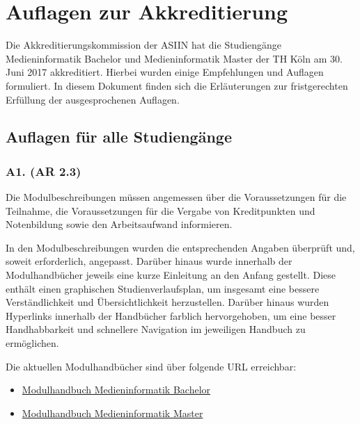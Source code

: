 \chapter{Auflagen zur
Akkreditierung\label{/mi-2017/selbstbericht/auflagen/0000-auflagen}}\label{auflagen-zur-akkreditierungpathlabelmi-2017selbstberichtauflagen0000-auflagen}

Die Akkreditierungskommission der ASIIN hat die Studiengänge
Medieninformatik Bachelor und Medieninformatik Master der TH Köln am 30.
Juni 2017 akkreditiert. Hierbei wurden einige Empfehlungen und Auflagen
formuliert. In diesem Dokument finden sich die Erläuterungen zur
fristgerechten Erfüllung der ausgesprochenen Auflagen.

\section{Auflagen für alle
Studiengänge\label{/mi-2017/selbstbericht/auflagen/0000-auflagen}}\label{auflagen-fuxfcr-alle-studienguxe4ngepathlabelmi-2017selbstberichtauflagen0000-auflagen}

\subsection{A1. (AR
2.3)\label{/mi-2017/selbstbericht/auflagen/0000-auflagen}}\label{a1.-ar-2.3pathlabelmi-2017selbstberichtauflagen0000-auflagen}

\begin{siderules}
Die Modulbeschreibungen müssen angemessen über die Voraussetzungen für
die Teilnahme, die Voraussetzungen für die Vergabe von Kreditpunkten und
Notenbildung sowie den Arbeitsaufwand informieren.
\end{siderules}

In den Modulbeschreibungen wurden die entsprechenden Angaben überprüft
und, soweit erforderlich, angepasst. Darüber hinaus wurde innerhalb der
Modulhandbücher jeweils eine kurze Einleitung an den Anfang gestellt.
Diese enthält einen graphischen Studienverlaufsplan, um insgesamt eine
bessere Verständlichkeit und Übersichtlichkeit herzustellen. Darüber
hinaus wurden Hyperlinks innerhalb der Handbücher farblich
hervorgehoben, um eine besser Handhabbarkeit und schnellere Navigation
im jeweiligen Handbuch zu ermöglichen.

Die aktuellen Modulhandbücher sind über folgende URL erreichbar:

\begin{itemize}
\tightlist
\item
  \href{http://www.medieninformatik.th-koeln.de/download/modulbeschreibungen-bachelor-bpo4.pdf}{Modulhandbuch
  Medieninformatik Bachelor}
\item
  \href{http://www.medieninformatik.th-koeln.de/download/modulbeschreibungen-master-mpo4.pdf}{Modulhandbuch
  Medieninformatik Master}
\end{itemize}

